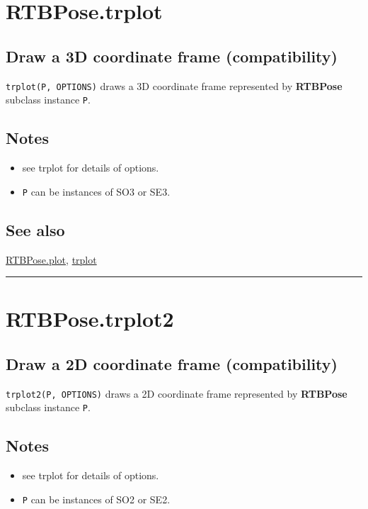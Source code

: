 \hypertarget{RTBPose.trplot}{\section*{RTBPose.trplot}}
\subsection*{Draw a 3D coordinate frame (compatibility)}


\texttt{trplot(P, OPTIONS)} draws a 3D coordinate frame represented by \textbf{\color{red} RTBPose}
subclass instance \texttt{P}.


\subsection*{Notes}
\begin{itemize}
  \item see trplot for details of options.
  \item \texttt{P} can be instances of SO3 or SE3.
\end{itemize}

\subsection*{See also}


\hyperlink{RTBPose.plot}{\color{blue} RTBPose.plot}, \hyperlink{trplot}{\color{blue} trplot}

\vspace{1.5ex}\hrule

\hypertarget{RTBPose.trplot2}{\section*{RTBPose.trplot2}}
\subsection*{Draw a 2D coordinate frame (compatibility)}


\texttt{trplot2(P, OPTIONS)} draws a 2D coordinate frame represented by \textbf{\color{red} RTBPose}
subclass instance \texttt{P}.


\subsection*{Notes}
\begin{itemize}
  \item see trplot for details of options.
  \item \texttt{P} can be instances of SO2 or SE2.
\end{itemize}

